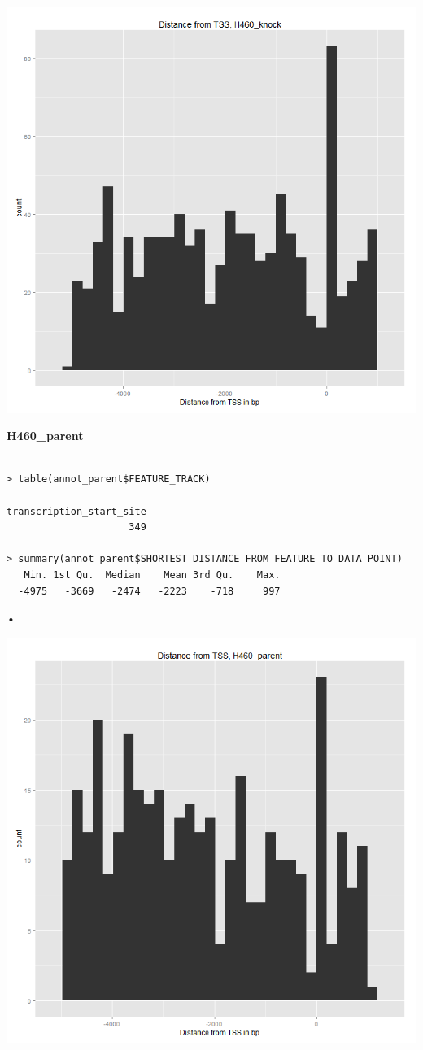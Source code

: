 \documentclass[11pt]{article}
\begin{document}
\includegraphics[scale=0.5]{distribution_knocking.png}


{\bf H460\_parent}

\begin{verbatim}

> table(annot_parent$FEATURE_TRACK)

transcription_start_site 
                     349 

> summary(annot_parent$SHORTEST_DISTANCE_FROM_FEATURE_TO_DATA_POINT)
   Min. 1st Qu.  Median    Mean 3rd Qu.    Max. 
  -4975   -3669   -2474   -2223    -718     997 

\end{verbatim}•

\includegraphics[scale=0.5]{distribution_parent.png}
\end{document}
